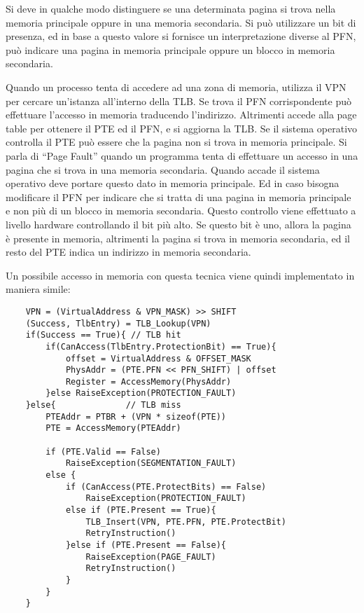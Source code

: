 \documentclass{article}
\numberwithin{equation}{subsection}
\begin{document}

Si deve in qualche modo distinguere se una determinata pagina si trova nella memoria principale oppure in una memoria secondaria. Si può utilizzare un bit di 
presenza, ed in base a questo valore si fornisce un interpretazione diverse al PFN, può indicare una pagina in memoria principale oppure un blocco in memoria secondaria. 

Quando un processo tenta di accedere ad una zona di memoria, utilizza il VPN per cercare un'istanza all'interno della TLB. Se trova il PFN corrispondente può effettuare l'accesso 
in memoria traducendo l'indirizzo. Altrimenti accede alla page table per ottenere il PTE ed il PFN, e si aggiorna la TLB. 
Se il sistema operativo controlla il PTE può essere che la pagina non si trova in memoria principale. 
Si parla di ``Page Fault'' quando un programma tenta di effettuare un accesso in una pagina che si trova in una memoria secondaria. Quando accade il sistema operativo 
deve portare questo dato in memoria principale. Ed in caso bisogna modificare il PFN per indicare che si tratta di una pagina in memoria principale e non più di un blocco 
in memoria secondaria. Questo controllo viene effettuato a livello hardware controllando il bit più alto. Se questo bit è uno, allora la pagina è presente in memoria, 
altrimenti la pagina si trova in memoria secondaria, ed il resto del PTE indica un indirizzo in memoria secondaria. 

Un possibile accesso in memoria con questa tecnica viene quindi implementato in maniera simile:

\begin{verbatim}
    VPN = (VirtualAddress & VPN_MASK) >> SHIFT
    (Success, TlbEntry) = TLB_Lookup(VPN)
    if(Success == True){ // TLB hit
        if(CanAccess(TlbEntry.ProtectionBit) == True){
            offset = VirtualAddress & OFFSET_MASK
            PhysAddr = (PTE.PFN << PFN_SHIFT) | offset
            Register = AccessMemory(PhysAddr)
        }else RaiseException(PROTECTION_FAULT)
    }else{              // TLB miss
        PTEAddr = PTBR + (VPN * sizeof(PTE))
        PTE = AccessMemory(PTEAddr)

        if (PTE.Valid == False)
            RaiseException(SEGMENTATION_FAULT)
        else {
            if (CanAccess(PTE.ProtectBits) == False)    
                RaiseException(PROTECTION_FAULT)
            else if (PTE.Present == True){
                TLB_Insert(VPN, PTE.PFN, PTE.ProtectBit)
                RetryInstruction()
            }else if (PTE.Present == False){
                RaiseException(PAGE_FAULT)
                RetryInstruction()
            }
        }
    }   
\end{verbatim}
\end{document}
